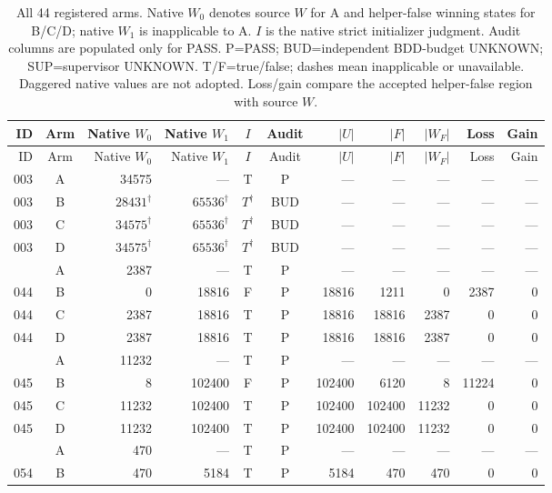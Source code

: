 \begingroup\small\setlength{\tabcolsep}{3pt}
\begin{longtable}{@{}rcrrccrrrrr@{}}
\caption{All 44 registered arms. Native $W_0$ denotes source $W$ for A
and helper-false winning states for B/C/D; native $W_1$ is inapplicable to A.
$I$ is the native strict initializer judgment. Audit columns are populated
only for PASS. P=PASS; BUD=independent BDD-budget UNKNOWN;
SUP=supervisor UNKNOWN. T/F=true/false; dashes mean inapplicable or
unavailable. Daggered native values are not adopted.
Loss/gain compare the accepted helper-false region with source $W$.}
\label{tab:compiled-cohort-all44}\\
\toprule ID & Arm & Native $W_0$ & Native $W_1$ & $I$ & Audit & $|U|$ & $|F|$ & $|W_F|$ & Loss & Gain\\\midrule
\endfirsthead
\toprule ID & Arm & Native $W_0$ & Native $W_1$ & $I$ & Audit & $|U|$ & $|F|$ & $|W_F|$ & Loss & Gain\\\midrule
\endhead
003 & A & 34575 & --- & T & P & --- & --- & --- & --- & --- \\
003 & B & $28431^{\dagger}$ & $65536^{\dagger}$ & $T^{\dagger}$ & BUD & --- & --- & --- & --- & --- \\
003 & C & $34575^{\dagger}$ & $65536^{\dagger}$ & $T^{\dagger}$ & BUD & --- & --- & --- & --- & --- \\
003 & D & $34575^{\dagger}$ & $65536^{\dagger}$ & $T^{\dagger}$ & BUD & --- & --- & --- & --- & --- \\
\addlinespace[2pt]
044 & A & 2387 & --- & T & P & --- & --- & --- & --- & --- \\
044 & B & 0 & 18816 & F & P & 18816 & 1211 & 0 & 2387 & 0 \\
044 & C & 2387 & 18816 & T & P & 18816 & 18816 & 2387 & 0 & 0 \\
044 & D & 2387 & 18816 & T & P & 18816 & 18816 & 2387 & 0 & 0 \\
\addlinespace[2pt]
045 & A & 11232 & --- & T & P & --- & --- & --- & --- & --- \\
045 & B & 8 & 102400 & F & P & 102400 & 6120 & 8 & 11224 & 0 \\
045 & C & 11232 & 102400 & T & P & 102400 & 102400 & 11232 & 0 & 0 \\
045 & D & 11232 & 102400 & T & P & 102400 & 102400 & 11232 & 0 & 0 \\
\addlinespace[2pt]
054 & A & 470 & --- & T & P & --- & --- & --- & --- & --- \\
054 & B & 470 & 5184 & T & P & 5184 & 470 & 470 & 0 & 0 \\

\end{longtable}
